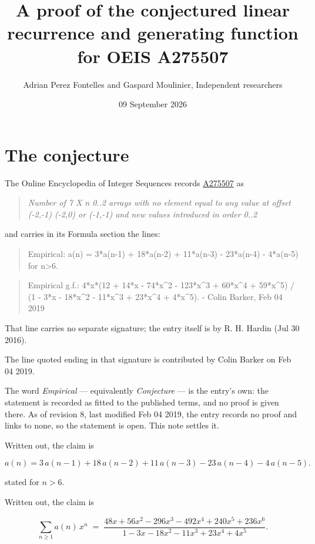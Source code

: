 \documentclass[11pt]{article}
\title{A proof of the conjectured linear recurrence and generating function for OEIS A275507}
\author{Adrian Perez Fontelles and Gaspard Moulinier, Independent researchers}
\date{09 September 2026}
\theoremstyle{definition}
\begin{document}
\maketitle
\section{The conjecture}

The Online Encyclopedia of Integer Sequences records \href{https://oeis.org/A275507}{A275507} as

\begin{quote}\itshape Number of 7 X n 0..2 arrays with no element equal to any value at offset (-2,-1) (-2,0) or (-1,-1) and new values introduced in order 0..2\end{quote}

and carries in its Formula section the lines:

\begin{quote}\ttfamily Empirical: a(n) = 3*a(n-1) + 18*a(n-2) + 11*a(n-3) - 23*a(n-4) - 4*a(n-5) for n>6.\end{quote}

\begin{quote}\ttfamily Empirical g.f.: 4*x*(12 + 14*x - 74*x\textasciicircum{}2 - 123*x\textasciicircum{}3 + 60*x\textasciicircum{}4 + 59*x\textasciicircum{}5) / (1 - 3*x - 18*x\textasciicircum{}2 - 11*x\textasciicircum{}3 + 23*x\textasciicircum{}4 + 4*x\textasciicircum{}5). - Colin Barker, Feb 04 2019\end{quote}

That line carries no separate signature; the entry itself is by R. H. Hardin (Jul 30 2016).

The line quoted ending in that signature is contributed by Colin Barker on Feb 04 2019.

The word {\itshape Empirical} --- equivalently {\itshape Conjecture} --- is the entry's own: the statement is recorded as fitted to the published terms, and no proof is given there. As of revision 8, last modified Feb 04 2019, the entry records no proof and links to none, so the statement is open. This note settles it.

Written out, the claim is

\[a(n) = 3\,a(n-1) + 18\,a(n-2) + 11\,a(n-3) - 23\,a(n-4) - 4\,a(n-5).\]

stated for $n > 6$.

Written out, the claim is

\[\sum_{n \ge 1} a(n)\,x^n \;=\; \frac{48x + 56x^{2} - 296x^{3} - 492x^{4} + 240x^{5} + 236x^{6}}{1 - 3x - 18x^{2} - 11x^{3} + 23x^{4} + 4x^{5}}.\]
\end{document}
